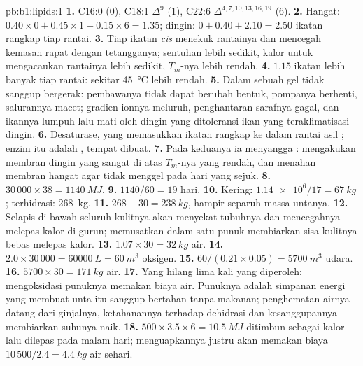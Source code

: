 \begin{solution}{pb:b1:lipids:1}
\textbf{1.} C16:0 (0), C18:1 $\Delta^9$ (1), C22:6 $\Delta^{4,7,10,13,16,19}$
(6).
\textbf{2.} Hangat: $0.40\times 0 + 0.45\times 1 + 0.15\times 6 = 1.35$;
dingin: $0 + 0.40 + 2.10 = 2.50$ ikatan rangkap tiap rantai.
\textbf{3.} Tiap ikatan \emph{cis} menekuk rantainya dan mencegah
kemasan rapat dengan tetangganya; sentuhan  lebih
sedikit, kalor untuk mengacaukan rantainya lebih sedikit, $T_m$-nya
lebih rendah.
\textbf{4.} $1.15$ ikatan lebih banyak tiap rantai: sekitar
\qty{45}{\celsius} lebih rendah.
\textbf{5.} Dalam sebuah gel  tidak sanggup bergerak: pembawanya
tidak dapat berubah bentuk, pompanya berhenti, salurannya macet;
gradien ionnya meluruh, penghantaran sarafnya gagal, dan ikannya lumpuh
lalu mati oleh dingin yang ditoleransi ikan yang teraklimatisasi dingin.
\textbf{6.} Desaturase, yang memasukkan ikatan rangkap ke dalam rantai
asil ; enzim itu adalah  ,
tempat  dibuat.
\textbf{7.} Pada keduanya ia menyangga : mengakukan membran
dingin yang sangat  di atas $T_m$-nya yang rendah, dan menahan
membran hangat agar tidak menggel pada hari yang sejuk.
\textbf{8.} $30\,000\times 38 = \qty{1140}{MJ}$.
\textbf{9.} $1140/60 = 19$ hari.
\textbf{10.} Kering: $\num{1.14e6}/17 = \qty{67}{kg}$; terhidrasi:
\qty{268}{kg}.
\textbf{11.} $268 - 30 = \qty{238}{kg}$, hampir separuh massa untanya.
\textbf{12.} Selapis  di bawah seluruh kulitnya akan menyekat
tubuhnya dan mencegahnya melepas kalor di gurun; memusatkan 
dalam satu punuk membiarkan sisa kulitnya bebas melepas kalor.
\textbf{13.} $1.07\times 30 = \qty{32}{kg}$ air.
\textbf{14.} $2.0\times 30\,000 = \qty{60000}{L} = \qty{60}{m^3}$
oksigen.
\textbf{15.} $60/(0.21\times 0.05) = \qty{5700}{m^3}$ udara.
\textbf{16.} $5700\times 30 = \qty{171}{kg}$ air.
\textbf{17.} Yang hilang lima kali yang diperoleh: mengoksidasi punuknya
memakan biaya air. Punuknya adalah simpanan energi yang membuat unta itu
sanggup bertahan tanpa makanan; penghematan airnya datang dari
ginjalnya, ketahanannya terhadap dehidrasi dan kesanggupannya
membiarkan suhunya naik.
\textbf{18.} $500\times 3.5\times 6 = \qty{10.5}{MJ}$ ditimbun sebagai kalor lalu dilepas pada malam hari; menguapkannya justru akan memakan biaya $10\,500/2.4 = \qty{4.4}{kg}$ air sehari.

\end{solution}
